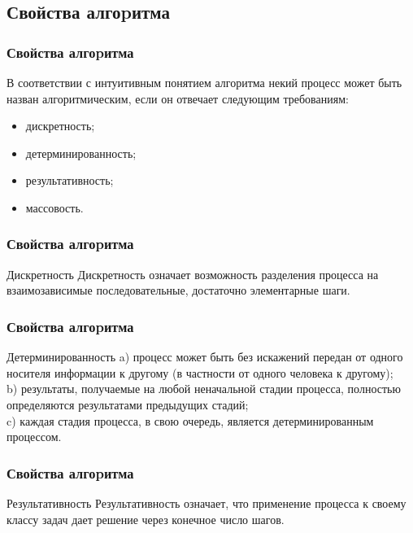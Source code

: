 \subsection{Свойства алгоpитма}
	\begin{frame}
\frametitle{Свойства алгоpитма}

В соответствии с интуитивным понятием алгоритма некий процесс может быть назван алгоритмическим, если он отвечает следующим требованиям:
\begin{itemize}

\item дискретность;

\item детерминированность;

\item результативность;

\item массовость.
\end{itemize}
\end{frame}

\begin{frame}
\frametitle{Свойства алгоpитма}
\begin{block}{Дискретность}
 Дискретность означает возможность разделения процесса на взаимозависимые последовательные, достаточно элементарные шаги.
\end{block}



\end{frame}

\begin{frame}
\frametitle{Свойства алгоpитма}

\begin{block}{Детерминированность}
a)      процесс может быть без искажений передан от одного носителя информации к другому (в частности от одного человека к другому);\\
b)      результаты, получаемые на любой неначальной стадии процесса, полностью определяются результатами предыдущих стадий;\\
c)      каждая стадия процесса, в свою очередь, является детерминированным процессом.
\end{block}

\end{frame}

\begin{frame}
\frametitle{Свойства алгоpитма}

\begin{block}{Результативность}
Результативность означает, что применение процесса к своему классу задач дает решение через конечное число шагов.
\end{block}

\end{frame}

